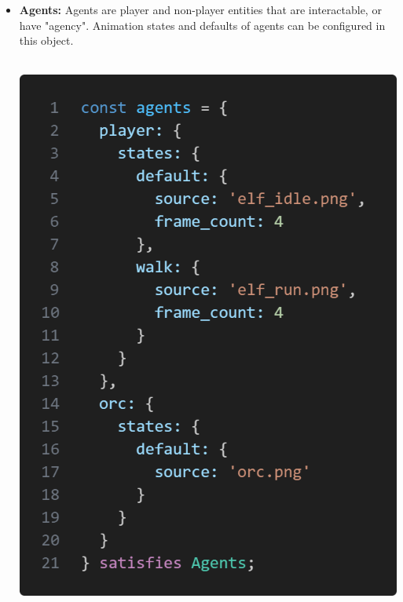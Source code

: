\documentclass{article}
\begin{document}
\begin{itemize}
    \item \textbf{Agents:} Agents are player and non-player entities that are interactable, or have "agency". Animation states and defaults of agents can be configured in this object.\\\\
    \begin{minipage}{\linewidth}
        \centering
        \includegraphics[width=1\textwidth]{agents.png}
        \label{fig:figure3}
    \end{minipage}
    

\end{itemize}
\end{document}

